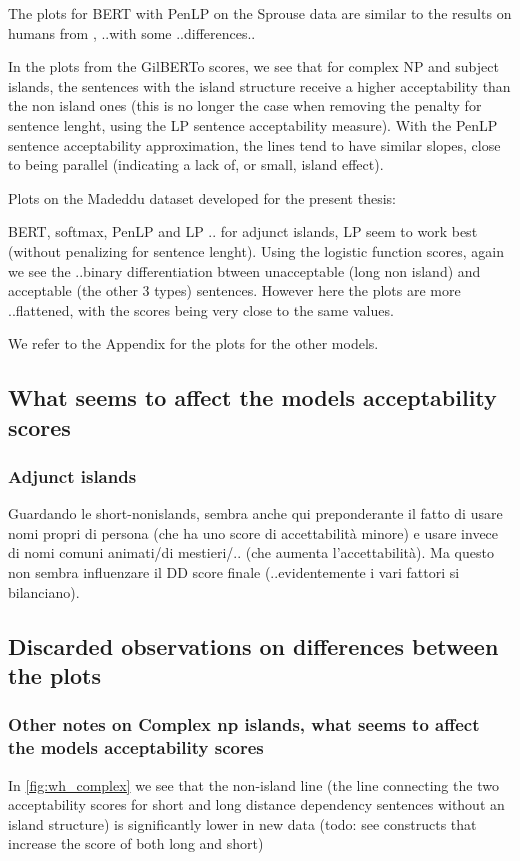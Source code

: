 The plots for BERT with PenLP on the Sprouse data are similar to the results on humans from \citet{sprouse2016experimental}, ..with some ..differences..


In the plots from the GilBERTo scores, we see that for complex NP and subject islands, the sentences with the island structure receive a higher acceptability than the non island ones (this is no longer the case when removing the penalty for sentence lenght, using the LP sentence acceptability measure). With the PenLP sentence acceptability approximation, the lines tend to have similar slopes, close to being parallel (indicating a lack of, or small, island effect). 


Plots on the Madeddu dataset developed for the present thesis:

BERT, softmax, PenLP and LP
..
for adjunct islands, LP seem to work best (without penalizing for sentence lenght).
Using the logistic function scores, again we see the ..binary differentiation btween unacceptable (long non island) and acceptable (the other 3 types) sentences. However here the plots are more ..flattened, with the scores being very close to the same values.

We refer to the Appendix for the plots for the other models.

\subsection{What seems to affect the models acceptability scores}


\subsubsection{Adjunct islands}

Guardando le short-nonislands, sembra anche qui preponderante il fatto di usare nomi propri di persona (che ha uno score di accettabilità minore) e usare invece di nomi comuni animati/di mestieri/.. (che aumenta l’accettabilità). Ma questo non sembra influenzare il DD score finale (..evidentemente i vari fattori si bilanciano).


\subsection{Discarded observations on differences between the plots}

\subsubsection{Other notes on  Complex np islands,  what seems to affect the models acceptability scores}
In \autoref{fig:wh_complex} we see that the non-island line (the line connecting the two acceptability scores for short and long distance dependency sentences without an island structure) is significantly lower in new data (todo: see constructs that increase the score of both long and short)

